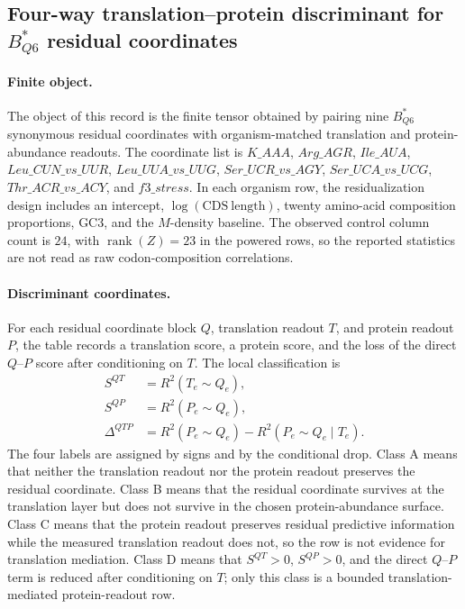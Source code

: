 \subsection{Four-way translation--protein discriminant for $B^*_{Q6}$ residual coordinates}
\label{sec:q6-four-case-translation-protein-discriminant-cross-layer}

\paragraph{Finite object.}
The object of this record is the finite tensor obtained by pairing nine $B^*_{Q6}$ synonymous residual coordinates with organism-matched translation and protein-abundance readouts. The coordinate list is
$K\_AAA$, $Arg\_AGR$, $Ile\_AUA$, $Leu\_CUN\_vs\_UUR$, $Leu\_UUA\_vs\_UUG$, $Ser\_UCR\_vs\_AGY$, $Ser\_UCA\_vs\_UCG$, $Thr\_ACR\_vs\_ACY$, and $f3\_stress$. In each organism row, the residualization design includes an intercept, $\log(\mathrm{CDS\ length})$, twenty amino-acid composition proportions, GC3, and the $M$-density baseline. The observed control column count is $24$, with $\operatorname{rank}(Z)=23$ in the powered rows, so the reported statistics are not read as raw codon-composition correlations.

\paragraph{Discriminant coordinates.}
For each residual coordinate block $Q$, translation readout $T$, and protein readout $P$, the table records a translation score, a protein score, and the loss of the direct $Q$--$P$ score after conditioning on $T$. The local classification is
$$
\begin{aligned}
S^{QT} &= R^2(T_e \sim Q_e),\\
S^{QP} &= R^2(P_e \sim Q_e),\\
\Delta^{QTP} &= R^2(P_e \sim Q_e)-R^2(P_e \sim Q_e\mid T_e).
\end{aligned}
$$
The four labels are assigned by signs and by the conditional drop. Class A means that neither the translation readout nor the protein readout preserves the residual coordinate. Class B means that the residual coordinate survives at the translation layer but does not survive in the chosen protein-abundance surface. Class C means that the protein readout preserves residual predictive information while the measured translation readout does not, so the row is not evidence for translation mediation. Class D means that $S^{QT}>0$, $S^{QP}>0$, and the direct $Q$--$P$ term is reduced after conditioning on $T$; only this class is a bounded translation-mediated protein-readout row.

